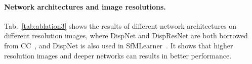 \documentclass{article}
\newcommand{\tabref}[1]{Tab.~\ref{#1}}
\begin{document}
\begin{table}[ht]
    \caption{Ablation studies on scale numbers of supervision.} 
    \label{tab:ablation2}
    \centering
    \vspace{-2mm}
\end{table}




\paragraph{Network architectures and image resolutions.}
\tabref{tab:ablation3} shows the results of different network architectures on different resolution images,
where DispNet and DispResNet are both borrowed from CC~\cite{ranjan2019cc}, and DispNet is also used in SfMLearner~\cite{zhou2017unsupervised}.
It shows that higher resolution images and deeper networks can results in better performance.
\end{document}
